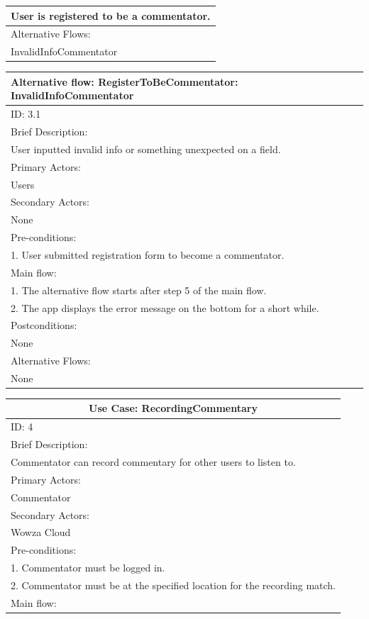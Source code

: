 \documentclass{article}
\begin{document}
\begin{flushleft}
\begin{longtable}[l]{|l|}
User is registered to be a commentator.\\
\hline
Alternative Flows:\\
InvalidInfoCommentator\\
\hline
\end{longtable}
\begin{longtable}[l]{|l|}
\hline
Alternative flow: RegisterToBeCommentator: InvalidInfoCommentator\\
\hline
ID: 3.1\\
\hline
Brief Description: \\
User inputted invalid info or something unexpected on a field.\\
\hline
Primary Actors:\\
Users\\
\hline
Secondary Actors:\\
None\\
\hline
Pre-conditions:\\
1. User submitted registration form to become a commentator.\\
\hline
Main flow:\\
1. The alternative flow starts after step 5 of the main flow.\\
2. The app displays the error message on the bottom for a short while.\\
\hline
Postconditions:\\
None\\
\hline
Alternative Flows:\\
None\\
\hline
\end{longtable}
\begin{longtable}[l]{|l|}
\hline
\multicolumn{1}{|c|}{Use Case: RecordingCommentary}\\
\hline
ID: 4\\
\hline
Brief Description: \\
Commentator can record commentary for other users to listen to.\\
\hline
Primary Actors:\\
Commentator\\
\hline
Secondary Actors:\\
Wowza Cloud\\
\hline
Pre-conditions:\\
1. Commentator must be logged in.\\
2. Commentator must be at the specified location for the recording match.\\
\hline
Main flow:\\

\end{longtable}
\end{flushleft}
\end{document}
